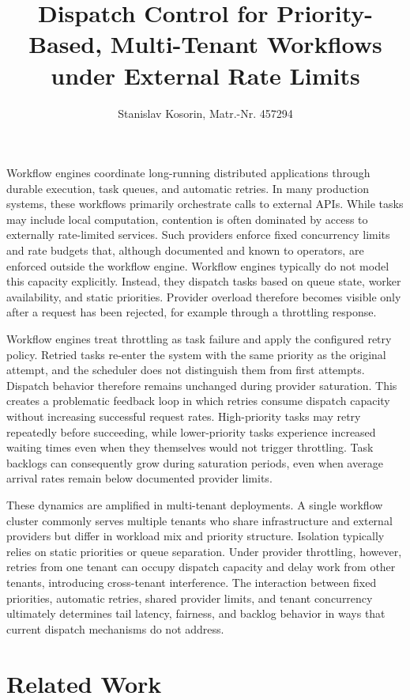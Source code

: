 \documentclass{article}
\title{\textbf{Dispatch Control for Priority-Based, Multi-Tenant Workflows under External Rate Limits}}
\author{Stanislav Kosorin, Matr.-Nr. 457294}
\begin{document}
\maketitle
Workflow engines coordinate long-running distributed applications through durable execution, task queues, and automatic retries. In many production systems, these workflows primarily orchestrate calls to external APIs. While tasks may include local computation, contention is often dominated by access to externally rate-limited services. Such providers enforce fixed concurrency limits and rate budgets that, although documented and known to operators, are enforced outside the workflow engine. Workflow engines typically do not model this capacity explicitly. Instead, they dispatch tasks based on queue state, worker availability, and static priorities. Provider overload therefore becomes visible only after a request has been rejected, for example through a throttling response.

Workflow engines treat throttling as task failure and apply the configured retry policy. Retried tasks re-enter the system with the same priority as the original attempt, and the scheduler does not distinguish them from first attempts. Dispatch behavior therefore remains unchanged during provider saturation. This creates a problematic feedback loop in which retries consume dispatch capacity without increasing successful request rates. High-priority tasks may retry repeatedly before succeeding, while lower-priority tasks experience increased waiting times even when they themselves would not trigger throttling. Task backlogs can consequently grow during saturation periods, even when average arrival rates remain below documented provider limits.

These dynamics are amplified in multi-tenant deployments. A single workflow cluster commonly serves multiple tenants who share infrastructure and external providers but differ in workload mix and priority structure. Isolation typically relies on static priorities or queue separation. Under provider throttling, however, retries from one tenant can occupy dispatch capacity and delay work from other tenants, introducing cross-tenant interference. The interaction between fixed priorities, automatic retries, shared provider limits, and tenant concurrency ultimately determines tail latency, fairness, and backlog behavior in ways that current dispatch mechanisms do not address.

\section*{Related Work}
\end{document}
